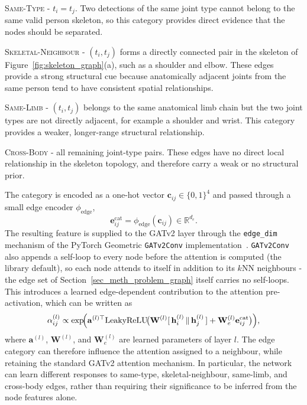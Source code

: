 \begin{compactitem}
    \item \textsc{Same-Type} - $t_i=t_j$.
        Two detections of the same joint type cannot belong to the same
        valid person skeleton,
        so this category provides direct evidence
        that the nodes should be separated.

    \item \textsc{Skeletal-Neighbour} - $(t_i,t_j)$ forms a directly
        connected pair in the skeleton of Figure~\ref{fig:skeleton_graph}(a),
        such as a shoulder and elbow.
        These edges provide a strong structural cue because
        anatomically adjacent joints from the same person tend to have
        consistent spatial relationships.

    \item \textsc{Same-Limb} - $(t_i,t_j)$ belongs to the same
        anatomical limb chain but the two joint types are not directly
        adjacent,
        for example a shoulder and wrist.
        This category provides a weaker,
        longer-range structural relationship.

    \item \textsc{Cross-Body} - all remaining joint-type pairs.
        These edges have no direct local relationship in the skeleton
        topology,
        and therefore carry a weak or no structural prior.
\end{compactitem}

The category is encoded as a one-hot vector
$\mathbf{c}_{ij}\in\{0,1\}^{4}$ and passed through a small edge encoder
$\phi_{\text{edge}}$,
\begin{equation}
    \mathbf{e}_{ij}^{\text{cat}}
    =
    \phi_{\text{edge}}(\mathbf{c}_{ij})
    \in \mathbb{R}^{d_e}.
\end{equation}
The resulting feature is supplied to the GATv2 layer through the
\texttt{edge\_dim} mechanism of the PyTorch Geometric
\texttt{GATv2Conv} implementation~\cite{fey2019pyg}.
\texttt{GATv2Conv} also appends a self-loop to every node before the attention is computed (the library default),
so each node attends to itself in addition to its $k$NN neighbours -
the edge set of Section~\ref{sec_meth_problem_graph} itself carries no self-loops.
This introduces a learned edge-dependent contribution
to the attention pre-activation,
which can be written as
\begin{equation}
    \alpha_{ij}^{(l)}
    \propto
    \exp\!\Bigl(
        \mathbf{a}^{(l)\top}
        \mathrm{LeakyReLU}\!\bigl(
            \mathbf{W}^{(l)}
            [\,\mathbf{h}_i^{(l)} \,\|\, \mathbf{h}_j^{(l)}\,]
            +
            \mathbf{W}_e^{(l)}
            \mathbf{e}_{ij}^{\text{cat}}
        \bigr)
    \Bigr),
    \label{eq:pggat_typeattn}
\end{equation}
where $\mathbf{a}^{(l)}$, $\mathbf{W}^{(l)}$, and
$\mathbf{W}_e^{(l)}$ are learned parameters of layer $l$.
The edge category can therefore influence the attention
assigned to a neighbour,
while retaining the standard GATv2 attention mechanism.
In particular, the network can learn different responses
to same-type, skeletal-neighbour, same-limb, and cross-body edges,
rather than requiring their significance to be inferred
from the node features alone.

